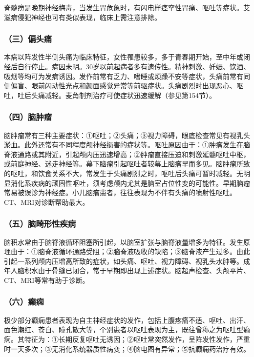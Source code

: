 脊髓痨是晚期神经梅毒，当发生胃危象时，有闪电样痉挛性胃痛、呕吐等症状。艾滋病侵犯神经也可有类似表现，临床上需注意排除。

\subsubsection{（三）偏头痛}

本病以阵发性半侧头痛为临床特征，女性罹患较多，多于青春期开始，至中年或闭经后自行停止。病因未明。30岁以前起病者多有遗传性。精神刺激、妊娠、饮酒、吸烟等均可为发病诱因。发作前常有乏力、嗜睡或烦躁不安等症状，头痛前常有同侧偏盲、眼前闪动性光点和颜面感觉异常等前驱症状。头痛剧烈时出现恶心、呕吐，吐后头痛减轻。麦角制剂治疗可使症状迅速缓解（参见第154节）。

\subsubsection{（四）脑肿瘤}

脑肿瘤常有三种主要症状：①呕吐；②头痛；③视力障碍，眼底检查常见有视乳头淤血。此外还常有不同程度颅神经损害的症状等。呕吐原因由于：①肿瘤发生在脑脊液通路或其附近，引起颅内压迅速增高；②肿瘤直接压迫和刺激延髓呕吐中枢，或前庭神经、迷走神经等。幕下脑瘤引起呕吐者较幕上脑瘤早而多见。脑肿瘤所致的呕吐，和饮食关系不大，常发生于头痛剧烈之时，呕吐后头痛可暂时减轻。无明显消化系疾病的顽固性呕吐，须考虑颅内尤其是脑室占位性变的可能性。早期脑瘤常易被误诊为神经症。小儿脑瘤患者，往往表现为不伴有头痛的喷射性呕吐。CT、MRI对诊断帮助最大。

\subsubsection{（五）脑畸形性疾病}

脑积水常由于脑脊液循环阻塞所引起，以脑室扩张与脑脊液量增多为特征。发生原理由于：①脑脊液循环通路受阻；②脑脊液吸收的缺陷；③脑脊液产生过多。由此引起一系列颅内压增高所致的症状，如头痛、呕吐、视力障碍、视乳头水肿等。成年人脑积水由于骨缝已闭合，常于早期即出现上述症状。脑超声检查、头颅平片、CT、MRI等常有助于诊断。

\subsubsection{（六）癫痫}

极少部分癫痫患者表现为自主神经症状的发作，包括上腹疼痛不适、呕吐、出汗、面色潮红、苍白、瞳孔散大等，个别患者以呕吐表现为主，既往曾称之为呕吐型癫痫。其特征为：①长期反复呕吐无诱因；②呕吐常突然发作，呈阵发性发作，严重时一天多次；③无消化系统器质性病变；④脑电图有异常；⑤抗癫痫药治疗有效。

